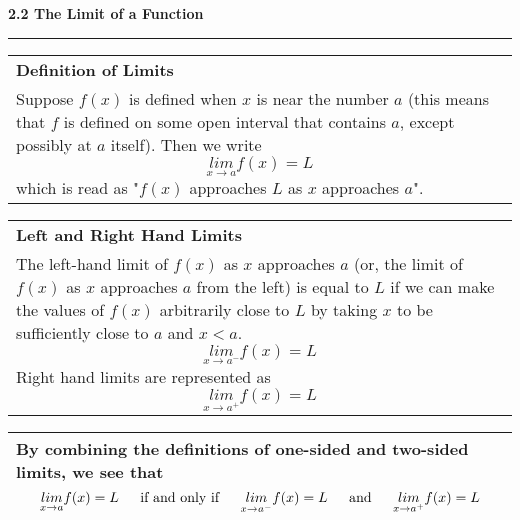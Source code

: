\documentclass[fleqn]{article}
\begin{document}
\begin{center}
{\begin{tabularx}{.9\textwidth}{|X|}
\hline
\end{tabularx}}
\vspace{12pt}
\pagebreak

\Large\textbf{2.2 The Limit of a Function}

\noindent\hfill\rule{0.3\textwidth}{.4pt}\hfill
\vspace{12pt}

\large
\def\arraystretch{1.3}
{\setlength{\tabcolsep}{16pt}
\begin{tabularx}{.9\textwidth}{|X|}
\hline
	\vspace{1pt}
	\textbf{Definition of Limits} \\[5pt]
	Suppose $f(x)$ is defined when $x$ is near the number $a$ (this means that $f$ is defined on some open interval that contains $a$, except possibly at $a$ itself).  Then we write
	$$\underset{x \to a}{lim} f(x) = L$$
	which is read as "$f(x)$ approaches $L$ as $x$ approaches $a$".  \\[16pt]
\hline
\end{tabularx}}
\vspace{12pt}

\def\arraystretch{1.3}
{\setlength{\tabcolsep}{16pt}
\begin{tabularx}{.9\textwidth}{|X|}
\hline
	\vspace{1pt}
	\textbf{Left and Right Hand Limits} \\[5pt]
	The left-hand limit of $f(x)$ as $x$ approaches $a$ (or, the limit of $f(x)$ as $x$ approaches $a$ from the left) is equal to $L$ if we can make the values of $f(x)$ arbitrarily close to $L$ by taking $x$ to be sufficiently close to $a$ and $x < a$.
	$$\underset{x \to a^-}{lim} f(x) = L$$
	Right hand limits are represented as
	$$\underset{x \to a^+}{lim} f(x) = L$$ \\
\hline
\end{tabularx}}
\vspace{12pt}

\def\arraystretch{1.3}
{\setlength{\tabcolsep}{16pt}
\begin{tabularx}{.9\textwidth}{|X|}
\hline
	\vspace{1pt}
	By combining the definitions of one-sided and two-sided limits, we see that
	$$\underset{x \to a}{lim} f(x) = L \text{\hspace{12pt} if and only if \hspace{12pt}} \underset{x \to a^-}{lim} f(x) = L \text{\hspace{12pt} and \hspace{12pt}} \underset{x \to a^+}{lim} f(x) = L$$ \\
\hline
\end{tabularx}}
\vspace{12pt}


\end{center}
\end{document}
